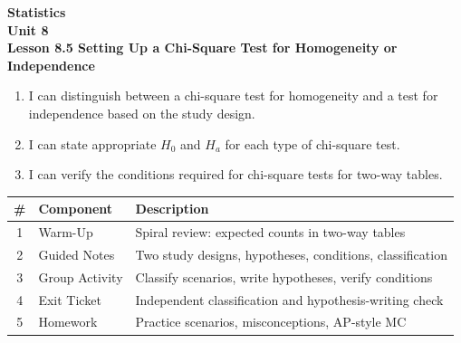 \documentclass[10pt]{article}
\begin{document}
\vspace{-0.8in}

\begin{center}
  {\color{white}\textbf{\LARGE Statistics}}\\[4pt]
  {\color{skymid}\large\textbf{Unit 8}}\\[6pt]
  {\color{white}\textbf{\large Lesson 8.5 \quad Setting Up a Chi-Square Test for Homogeneity or Independence}}
\end{center}

\vspace{0.22in}
\namedateperiod
\vspace{0.18in}

\begin{learningtargetbox}
\small
\begin{enumerate}[leftmargin=1.5em, itemsep=5pt]
  \item I can distinguish between a chi-square test for homogeneity and a test for
        independence based on the study design.
  \item I can state appropriate $H_0$ and $H_a$ for each type of chi-square test.
  \item I can verify the conditions required for chi-square tests for two-way tables.
\end{enumerate}
\end{learningtargetbox}

\vspace{0.14in}

\begin{tocbox}
\small
\renewcommand{\arraystretch}{1.5}
\begin{tabularx}{\linewidth}{@{} c l X @{}}
\rowcolor{sky}
\textbf{\#} & \textbf{Component} & \textbf{Description} \\
\midrule
1 & Warm-Up        & Spiral review: expected counts in two-way tables \\
2 & Guided Notes   & Two study designs, hypotheses, conditions, classification \\
3 & Group Activity & Classify scenarios, write hypotheses, verify conditions \\
4 & Exit Ticket    & Independent classification and hypothesis-writing check \\
5 & Homework       & Practice scenarios, misconceptions, AP-style MC \\
\end{tabularx}
\end{tocbox}
\end{document}
